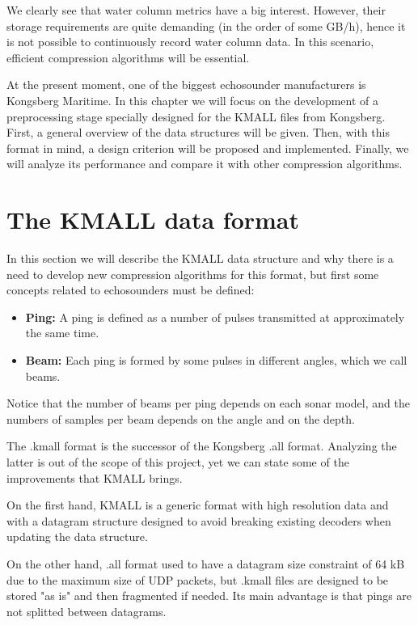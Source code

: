 We clearly see that water column metrics have a big interest. However, their storage requirements are quite demanding (in the order of some GB/h), hence it is not possible to continuously record water column data. In this scenario, efficient compression algorithms will be essential.

At the present moment, one of the biggest echosounder manufacturers is Kongsberg Maritime. In this chapter we will focus on the development of a preprocessing stage specially designed for the KMALL files from Kongsberg. First, a general overview of the data structures will be given. Then, with this format in mind, a design criterion will be proposed and implemented. Finally, we will analyze its performance and compare it with other compression algorithms.

\section{The KMALL data format}
In this section we will describe the KMALL data structure and why there is a need to develop new compression algorithms for this format, but first some concepts related to echosounders must be defined:
\begin{itemize}
	\item \textbf{Ping:} A ping is defined as a number of pulses transmitted at approximately the same time.
	\item \textbf{Beam:} Each ping is formed by some pulses in different angles, which we call beams.
\end{itemize}

Notice that the number of beams per ping depends on each sonar model, and the numbers of samples per beam depends on the angle and on the depth.

The .kmall format is the successor of the Kongsberg .all format. Analyzing the latter is out of the scope of this project, yet we can state some of the improvements that KMALL brings. 

On the first hand, KMALL is a generic format with high resolution data and with a datagram structure designed to avoid breaking existing decoders when updating the data structure.

On the other hand, .all format used to have a datagram size constraint of 64 kB due to the maximum size of UDP packets, but .kmall files are designed to be stored "as is" and then fragmented if needed. Its main advantage is that pings are not splitted between datagrams.

